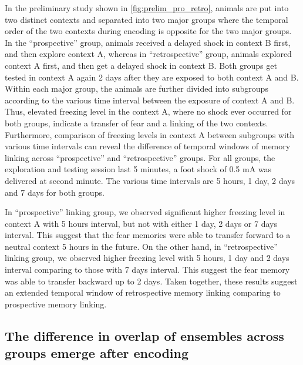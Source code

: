 \documentclass[master.tex]{subfiles}
\begin{document}
In the preliminary study shown in \autoref{fig:prelim_pro_retro}, animals are
put into two distinct contexts and separated into two major groups where the
temporal order of the two contexts during encoding is opposite for the two major
groups. In the ``prospective'' group, animals received a delayed shock in
context B first, and then explore context A, whereas in ``retrospective'' group,
animals explored context A first, and then get a delayed shock in context B.
Both groups get tested in context A again 2 days after they are exposed to both
context A and B. Within each major group, the animals are further divided into
subgroups according to the various time interval between the exposure of context
A and B. Thus, elevated freezing level in the context A, where no shock ever
occurred for both groups, indicate a transfer of fear and a linking of the two
contexts. Furthermore, comparison of freezing levels in context A between
subgroups with various time intervals can reveal the difference of temporal
windows of memory linking across ``prospective'' and ``retrospective'' groups.
For all groups, the exploration and testing session last 5 minutes, a foot shock
of 0.5 mA was delivered at second minute. The various time intervals are 5
hours, 1 day, 2 days and 7 days for both groups.

In ``prospective'' linking group, we observed significant higher freezing level
in context A with 5 hours interval, but not with either 1 day, 2 days or 7 days
interval. This suggest that the fear memories were able to transfer forward to a
neutral context 5 hours in the future. On the other hand, in ``retrospective''
linking group, we observed higher freezing level with 5 hours, 1 day and 2 days
interval comparing to those with 7 days interval. This suggest the fear memory
was able to transfer backward up to 2 days. Taken together, these results
suggest an extended temporal window of retrospective memory linking comparing to
prospective memory linking.

\subsection*{The difference in overlap of ensembles across groups emerge after
  encoding}

\end{document}
